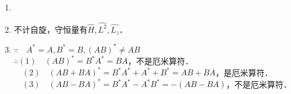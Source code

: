 
\begin{issues}
\issueDraft
\issueTODO
\end{issues}


\subsection{ }
\begin{enumerate}
\item 
\item 不计自旋，守恒量有$\hat H,\hat {L^2},\hat {L_z} $．
\item $\because \quad A^* = A,B^* = B,(AB)^* \neq AB $ \\
$\therefore (1)\quad (AB)^* = B^*A^* = BA $，不是厄米算符． \\
$\quad (2)\quad (AB+BA)^* = B^*A^*+A^*+B^* = AB+BA $，是厄米算符． \\
$\quad (3)\quad (AB-BA)^* = B^*A^*-A^*B^* = -(AB-BA) $，不是厄米算符． \\

\end{enumerate}
\subsection{ }
